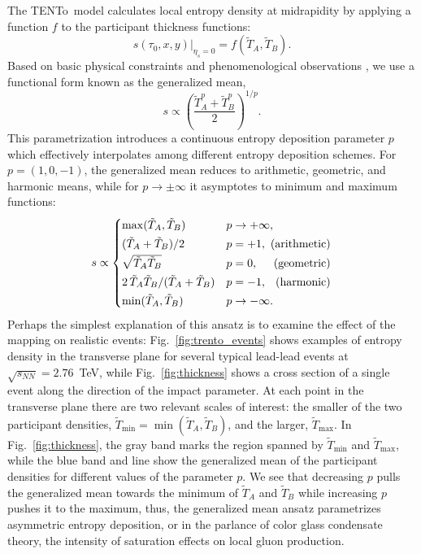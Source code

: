 \documentclass[aps,prc,reprint,amsmath,nofootinbib]{revtex4-1}
\newcommand{\trento}{T\raisebox{-0.5ex}{R}ENTo}
\newcommand{\sqrts}{\sqrt{s_{NN}}}
\newcommand{\T}{\tilde{T}}
\begin{document}
The \trento\ model calculates local entropy density at midrapidity by applying a function $f$ to the participant thickness functions:
\begin{equation}
  s(\tau_0, x, y)\vert_{\eta_s=0} = f(\T_A, \T_B).
  \label{eq:mapping}
\end{equation}
Based on basic physical constraints and phenomenological observations \cite{Moreland:2014oya}, we use a functional form known as the generalized mean,
\begin{equation}
  s \propto \left( \frac{\T_A^p + \T_B^p}{2} \right)^{1/p}.
  \label{eq:genmean}
\end{equation}
This parametrization introduces a continuous entropy deposition parameter $p$ which effectively interpolates among different entropy deposition schemes.
For ${p=(1, 0, -1)}$, the generalized mean reduces to arithmetic, geometric, and harmonic means, while for ${p \rightarrow \pm\infty}$ it asymptotes to minimum and maximum functions:
\begin{equation}
  \newlength{\extraspace}
  \setlength{\extraspace}{0.5ex}
  s \propto
  \begin{cases}
    \max(\T_A, \T_B) & p \rightarrow +\infty, \\[\extraspace]
    (\T_A + \T_B)/2 & p = +1, \hfill \text{ (arithmetic)} \\[\extraspace]
    \sqrt{\T_A \T_B} & p = 0, \hfill \text{ (geometric)} \\[\extraspace]
    2\, \T_A \T_B/(\T_A + \T_B) & p = -1, \hfill \text{ (harmonic)} \\[\extraspace]
    \min(\T_A, \T_B) & p \rightarrow -\infty.
  \end{cases}
  \label{eq:means}
\end{equation}
Perhaps the simplest explanation of this ansatz is to examine the effect of the mapping on realistic events:
Fig.~\ref{fig:trento_events} shows examples of entropy density in the transverse plane for several typical lead-lead events at $\sqrts=2.76$~TeV,
while Fig.~\ref{fig:thickness} shows a cross section of a single event along the direction of the impact parameter.
At each point in the transverse plane there are two relevant scales of interest:
the smaller of the two participant densities, $\T_\text{min} = \min(\T_A, \T_B)$, and the larger, $\T_\text{max}$.
In Fig.~\ref{fig:thickness}, the gray band marks the region spanned by $\T_\text{min}$ and $\T_\text{max}$, while the blue band and line show the generalized mean of the participant densities for different values of the parameter $p$.
We see that decreasing $p$ pulls the generalized mean towards the minimum of $\T_A$ and $\T_B$ while increasing $p$ pushes it to the maximum, thus, the generalized mean ansatz parametrizes asymmetric entropy deposition, or in the parlance of color glass condensate theory, the intensity of saturation effects on local gluon production.
\end{document}
